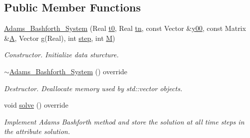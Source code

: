 \subsection*{Public Member Functions}
\begin{DoxyCompactItemize}
\item 
\mbox{\label{class_adams___bashforth___system_a6fabff52bfd4dee448d918ac40efb1ef}} 
\mbox{\hyperlink{class_adams___bashforth___system_a6fabff52bfd4dee448d918ac40efb1ef}{Adams\+\_\+\+Bashforth\+\_\+\+System}} (Real \mbox{\hyperlink{class_o_d_e___system_a1947b357608babc98c5e79d645e24c3c}{t0}}, Real \mbox{\hyperlink{class_o_d_e___system_a5c5a0dd9f04dfb8d8a84d49b741773af}{tn}}, const Vector \&\mbox{\hyperlink{class_o_d_e___system_a1379137a4480e5861fd1911bc061f908}{y00}}, const Matrix \&\mbox{\hyperlink{class_o_d_e___system_a632009677e80b62a1996e842398bf8b6}{A}}, Vector \mbox{\hyperlink{class_o_d_e___system_a5a294fda765e6cbfd7dfda43755d2c55}{g}}(Real), int \mbox{\hyperlink{class_adams___bashforth___system_abc285f795f629737fb82c223b896c5e8}{step}}, int \mbox{\hyperlink{class_o_d_e___system_a46e5ee402ffc7c500dccad753a1fba36}{M}})
\begin{DoxyCompactList}\small\item\em Constructor. Initialize data sturcture. \end{DoxyCompactList}\item 
\mbox{\label{class_adams___bashforth___system_af183f3376f969b50d1a09305a5bff62b}} 
\mbox{\hyperlink{class_adams___bashforth___system_af183f3376f969b50d1a09305a5bff62b}{$\sim$\+Adams\+\_\+\+Bashforth\+\_\+\+System}} () override
\begin{DoxyCompactList}\small\item\em Destructor. Deallocate memory used by std\+::vector objects. \end{DoxyCompactList}\item 
void \mbox{\hyperlink{class_adams___bashforth___system_aa34bb9a1367a3b15f606ff49054e9ece}{solve}} () override
\begin{DoxyCompactList}\small\item\em Implement Adams Bashforth method and store the solution at all time steps in the attribute solution. \end{DoxyCompactList}\end{DoxyCompactItemize}
